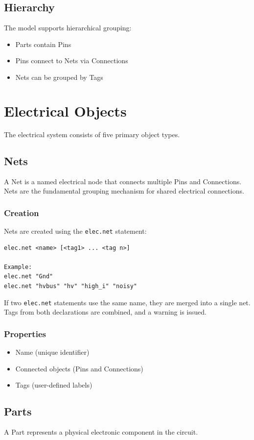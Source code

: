 \section{Hierarchy}
The model supports hierarchical grouping:
\begin{itemize}
\item Parts contain Pins
\item Pins connect to Nets via Connections
\item Nets can be grouped by Tags
\end{itemize}


\chapter{Electrical Objects}
The electrical system consists of five primary object types.

\section{Nets}
A Net is a named electrical node that connects multiple Pins and Connections. Nets are the fundamental grouping mechanism for shared electrical connections.

\subsection{Creation}
Nets are created using the \texttt{elec.net} statement:
\begin{verbatim}
elec.net <name> [<tag1> ... <tag n>]

Example:
elec.net "Gnd"
elec.net "hvbus" "hv" "high_i" "noisy"
\end{verbatim}
If two \texttt{elec.net} statements use the same name, they are merged into a single net. Tags from both declarations are combined, and a warning is issued.

\subsection{Properties}
\begin{itemize}
\item Name (unique identifier)
\item Connected objects (Pins and Connections)
\item Tags (user-defined labels)
\end{itemize}

\section{Parts}
A Part represents a physical electronic component in the circuit.


